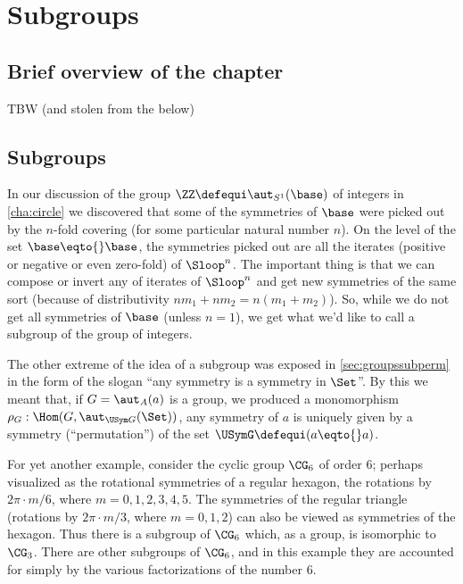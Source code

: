 \chapter{Subgroups}
\label{ch:subgroups}


\section{Brief overview of the chapter}
\label{sec:subgp-overview}

TBW (and stolen from the below)

\section{Subgroups}
\label{sec:subgroups}
In our discussion of the group $\ZZ\defequi\aut_{S^1}(\base)$ of integers in \cref{cha:circle} we discovered that some of the symmetries of $\base$ were picked out by the $n$-fold covering (for some particular natural number $n$).  On the level of the set $\base\eqto{}\base$, the symmetries picked out are all the iterates (positive or negative or even zero-fold) of $\Sloop^n$.  The important thing is that we can compose or invert any of iterates of $\Sloop^n$ and get new symmetries of the same sort (because of distributivity $nm_1+nm_2=n(m_1+m_2)$).  So, while we do not get all symmetries of $\base$ (unless $n=1$), we get what we'd like to call a subgroup of the group of integers. 



The other extreme of the idea of a subgroup was exposed in \cref{sec:groupssubperm} in the form of the slogan ``any symmetry is a symmetry in $\Set$''.
By this we meant that, if $G=\aut_A(a)$ is a group, we produced a monomorphism $\rho_G:\Hom(G,\aut_{\USym G}(\Set))$,
\ie any symmetry of $a$ is uniquely given by a symmetry (``permutation'') of the set $\USymG\defequi (a\eqto{}a)$.

For yet another example, consider the cyclic group $\CG_6$ of order $6$; perhaps visualized as the rotational symmetries of a regular hexagon,  \ie the rotations by $2\pi\cdot m /6$, where $m=0,1,2,3,4,5$.
The symmetries of the regular triangle (rotations by $2\pi\cdot m/3$, where $m=0,1,2$) can also be viewed as symmetries of the hexagon.
Thus there is a subgroup of $\CG_6$ which, as a group, is isomorphic to $\CG_3$.
There are other subgroups of $\CG_6$, and in this example they are accounted for simply by the various factorizations of the number $6$.

